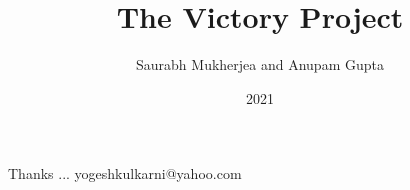 \documentclass[xcolor=dvipsnames,compress,t,pdf,9pt]{beamer}
\title[Victory Project \hspace{4cm} \insertframenumber /\inserttotalframenumber]
{The Victory Project}
\subtitle[]{Saurabh Mukherjea and Anupam Gupta}
\date{2021}
\begin{document}
\begin{frame}
\titlepage
\end{frame}




\begin{frame}[c]{}
Thanks ...
\vspace{5mm}
yogeshkulkarni@yahoo.com
\end{frame}
\end{document}
